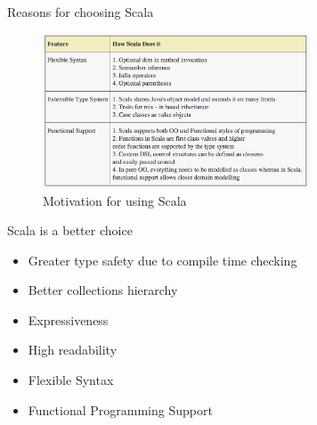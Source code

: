 
\begin{frame}{Reasons for choosing Scala}
\begin{figure}[H]
  \centering
    \includegraphics[width=300px]{figures/scala_motivation.png}
  \caption{Motivation for using Scala}
\end{figure}
\end{frame}

\begin{frame}{Scala is a better choice}
\begin{itemize}
\item Greater type safety due to compile time checking \cite{dslsInAction}
\item Better collections hierarchy
\item Expressiveness
\item High readability
\item Flexible Syntax
\item Functional Programming Support
\end{itemize}
\end{frame}


